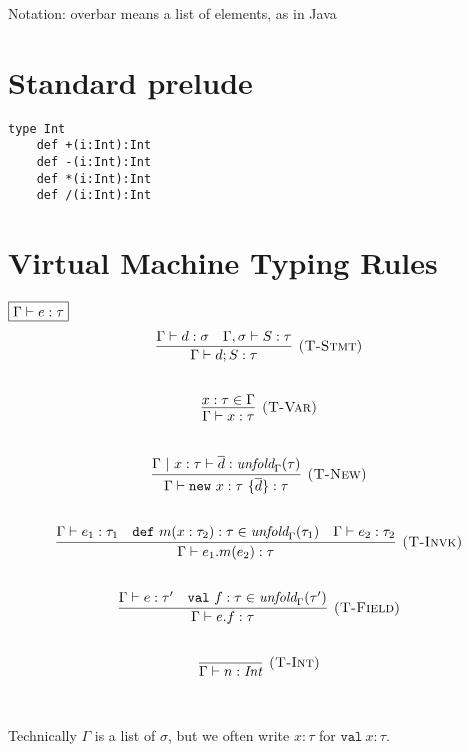 \documentclass{article}
\newcommand{\keywadj}[1]{\mathtt{#1}}
\newcommand{\keyw}[1]{\keywadj{#1}~}
\begin{document}
Notation: overbar means a list of elements, as in Java




\section{Standard prelude}

\begin{lstlisting}
type Int
    def +(i:Int):Int
    def -(i:Int):Int
    def *(i:Int):Int
    def /(i:Int):Int
\end{lstlisting}

\section{Virtual Machine Typing Rules}

$\fbox{$\Gamma \vdash e : \tau$}$
\[
\begin{array}{c}
\infer[\textsc{(T-Stmt)}]
  {\Gamma \vdash d; S : \tau}
  {\Gamma \vdash d : \sigma & \Gamma, \sigma \vdash S : \tau}\\[5ex]
  
\infer[\textsc{(T-Var)}]
  {\Gamma \vdash x : \tau}
  {x : \tau \in \Gamma}\\[5ex]

\infer[\textsc{(T-New)}]
	{\Gamma \vdash \keywadj{new}~x:\tau~\{\overline{d}\} : \tau}
	{\Gamma ~|~ x:\tau \vdash \overline{d} : \textit{unfold}_\Gamma(\tau)} \\[5ex]

\infer[\textsc{(T-Invk)}]
	{\Gamma \vdash e_1.m(e_2) : \tau} 
	{\Gamma \vdash e_1 : \tau_1  & \keyw{def} m(x:\tau_2):\tau \in \textit{unfold}_\Gamma(\tau_1) & \Gamma \vdash e_2 : \tau_2}\\[5ex]

\infer[\textsc{(T-Field)}]
	{\Gamma \vdash e.f : \tau} 
	{\Gamma \vdash e : \tau' & \keyw{val} f : \tau \in \textit{unfold}_\Gamma(\tau')}\\[5ex]

\infer[\textsc{(T-Int)}]
  {\Gamma \vdash n : \textit{Int}}
  {}\\[5ex]

\end{array}
\]

Technically $\Gamma$ is a list of $\sigma$, but we often write $x:\tau$ for $\keyw{val} x:\tau$.
\end{document}
